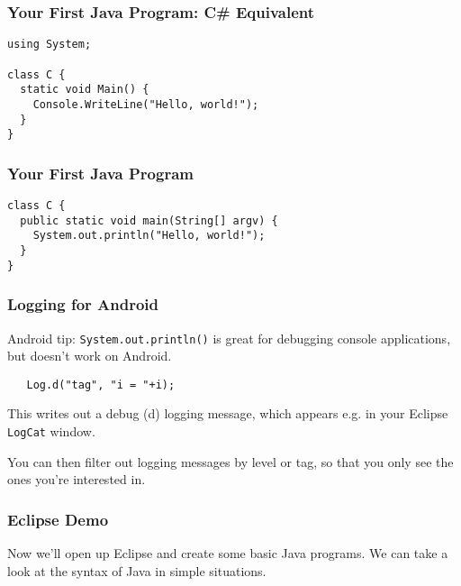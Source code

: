 \begin{frame}[fragile]
\frametitle{Your First Java Program: C\# Equivalent}
\begin{changemargin}{1cm}

\begin{verbatim}
using System;

class C {
  static void Main() {
    Console.WriteLine("Hello, world!");
  }
}
\end{verbatim}


\end{changemargin}
\end{frame}

\begin{frame}[fragile]
\frametitle{Your First Java Program}
\begin{changemargin}{1cm}

\begin{verbatim}
class C {
  public static void main(String[] argv) {
    System.out.println("Hello, world!");
  }
}
\end{verbatim}


\end{changemargin}
\end{frame}


\begin{frame}
\frametitle{Logging for Android}
\begin{changemargin}{1cm}
Android tip: {\tt System.out.println()} is great
for debugging console applications, but doesn't work on Android.

{\tt ~~~Log.d("tag", "i = "+i); }

This writes out a debug (d) logging message, which appears e.g. in your Eclipse
{\tt LogCat} window.


You can then filter out logging messages
by level or tag, so that you only see the ones you're interested in.

\end{changemargin}
\end{frame}


\begin{frame}
\frametitle{Eclipse Demo}
\begin{changemargin}{1cm}

Now we'll open up Eclipse and create some basic Java programs. We can take a look at the syntax of Java in simple situations.


\end{changemargin}
\end{frame}






